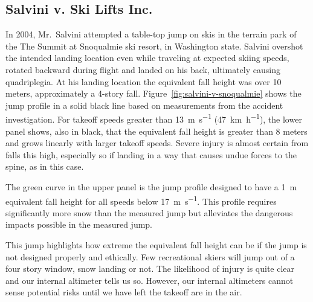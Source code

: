 \documentclass{article}
\begin{document}
\subsection{Salvini v. Ski Lifts Inc.}
%
In 2004, Mr.~Salvini attempted a table-top jump on skis in the terrain park of
the The Summit at Snoqualmie ski resort, in Washington state.  Salvini overshot
the intended landing location even while traveling at expected skiing speeds,
rotated backward during flight and landed on his back, ultimately causing
quadriplegia. At his landing location the equivalent fall height was over 10
meters, approximately a 4-story fall.  Figure~\ref{fig:salvini-v-snoqualmie}
shows the jump profile in a solid black line based on measurements from the
accident investigation.  For takeoff speeds greater than
13~\si{\meter\per\second} (47~\si{\kilo\meter\per\hour}), the lower panel
shows, also in black, that the equivalent fall height is greater than 8 meters
and grows linearly with larger takeoff speeds. Severe injury is almost certain
from falls this high, especially so if landing in a way that causes undue
forces to the spine, as in this case.

The green curve in the upper panel is the jump profile designed to have a
1~\si{\meter} equivalent fall height for all speeds below
17~\si{\meter\per\second}. This profile requires significantly more snow than
the measured jump but alleviates the dangerous impacts possible in the measured
jump.

This jump highlights how extreme the equivalent fall height can be if the jump
is not designed properly and ethically. Few recreational skiers will jump out
of a four story window, snow landing or not. The likelihood of injury is quite
clear and our internal altimeter tells us so. However, our internal altimeters
cannot sense potential risks until we have left the takeoff are in the air.
%
\end{document}
